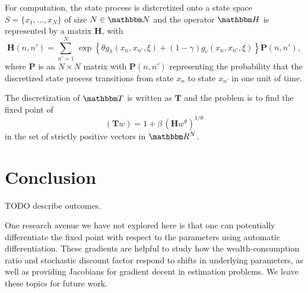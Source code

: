 \documentclass[12pt, reqno]{amsart}
\newcommand{\1}{\mathbbm 1}
\newcommand{\RR}{\mathbbm R}
\newcommand{\NN}{\mathbbm N}
\newcommand{\TT}{\mathbbm T}
\newcommand{\HH}{\mathbbm H}
\newcommand{\bH}{\mathbf H}
\newcommand{\bT}{\mathbf T}
\newcommand{\bP}{\mathbf P}
\theoremstyle{plain}
\theoremstyle{definition}
\begin{document}
For computation, the state process is distcretized onto a state space $S =
\{x_1, \ldots, x_N\}$ of size $N \in \NN$ and the operator $\HH$ is
represented by a matrix $\bH$, with 
%
\begin{equation}\label{eq:defkb}
    \bH(n, n') = \sum_{n'=1}^N 
        \,
        \exp
        \left\{ 
            \theta g_\lambda(x_n, x_{n'}, \xi) 
            + (1-\gamma) g_c(x_n, x_{n'}, \xi)
        \right\}
    \bP(n, n'),
\end{equation}
%
where $\bP$ is an $N \times N$ matrix with  $\bP(n, n')$ representing the
probability that the discretized state process transitions from state $x_n$ to
state $x_{n'}$ in one unit of time.

The discretization of $\TT$ is written as $\bT$ and the problem is to find the
fixed point of 
%
\begin{equation}\label{eq:wcopd}
    (\bT w) = 1 + \beta \,  (\bH w^\theta)^{1/\theta}
\end{equation}
%
in the set of strictly positive vectors in $\RR^N$.


\section{Conclusion}

TODO describe outcomes.

One research avenue we have not explored here is that one can potentially
differentiate the fixed point with respect to the parameters using automatic
differentiation. These gradients are helpful to study how the wealth-consumption
ratio and stochastic discount factor respond to shifts in underlying parameters,
as well as providing Jacobians for gradient decent in estimation problems.
We leave these topics for future work.






\end{document}
